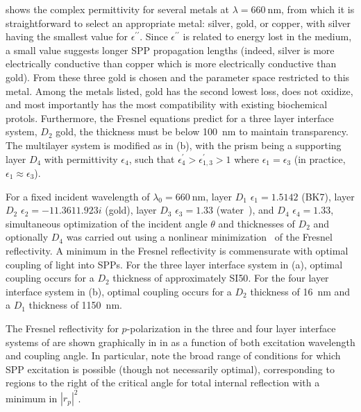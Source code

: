 shows the complex permittivity for several metals
at $\lambda=\SI{660}{\nano\meter}$, from which it is straightforward to
select an appropriate metal: silver, gold, or copper, with silver having
the smallest value for $\epsilon^{\prime\prime}$.  Since
$\epsilon^{\prime\prime}$ is related to energy lost in the medium, a small
value suggests longer SPP propagation lengths (indeed, silver is more
electrically conductive than copper which is more electrically conductive
than gold).  From these three gold is chosen and the parameter space
restricted to this metal.  Among the metals listed, gold has the second
lowest loss, does not oxidize, and most importantly has the most
compatibility with existing biochemical protols.  Furthermore, the Fresnel
equations predict for a three layer interface system, $D_2$ gold, the
thickness must be below \SI{100}{\nano\meter} to maintain transparency.
The multilayer system is modified as in (b),
with the prism being a supporting layer $D_4$ with permittivity
$\epsilon_4$, such that $\epsilon^\prime_4>\epsilon^\prime_{1,3}>1$ where
$\epsilon_1=\epsilon_3$ (in practice, $\epsilon_1\approx\epsilon_3$).

For a fixed incident wavelength of $\lambda_0=\SI{660}{\nano\meter}$, layer
$D_1$ $\epsilon_1=1.5142$ (BK7), layer $D_2$
$\epsilon_2=\num{-11.361+1.923i}$ (gold), layer $D_3$ $\epsilon_3=1.33$
(water~\cite{andreasson1971measurement}), and $D_4$ $\epsilon_4=1.33$,
simultaneous optimization of the incident angle $\theta$ and thicknesses of
$D_2$ and optionally $D_4$ was carried out using a nonlinear
minimization~\cite{brent1973algorithms} of the Fresnel reflectivity.  A
minimum in the Fresnel reflectivity is commensurate with optimal coupling
of light into SPPs.  For the three layer interface system in
(a), optimal coupling occurs for a $D_2$
thickness of approximately SI{50}{\nano\meter}.  For the four layer
interface system in (b), optimal coupling
occurs for a $D_2$ thickness of \SI{16}{\nano\meter} and a $D_1$ thickness
of \SI{1150}{\nano\meter}.

The Fresnel reflectivity for $p$-polarization in the three and four layer
interface systems of  are shown graphically
in in  as a function of both excitation wavelength
and coupling angle.  In particular, note the broad range of conditions for
which SPP excitation is possible (though not necessarily optimal),
corresponding to regions to the right of the critical angle for total
internal reflection with a minimum in $|r_p|^2$.

